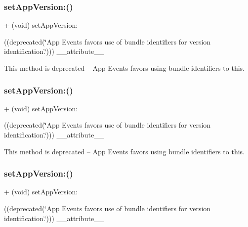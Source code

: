 \subsubsection{\texorpdfstring{set\+App\+Version\+:()}{setAppVersion:()}\hspace{0.1cm}{\footnotesize\ttfamily [1/5]}}
{\footnotesize\ttfamily + (void) set\+App\+Version\+: \begin{DoxyParamCaption}\item[{((deprecated(\char`\"{}App Events favors use of bundle identifiers for version identification.\char`\"{})))}]{\+\_\+\+\_\+attribute\+\_\+\+\_\+ }\end{DoxyParamCaption}}

This method is deprecated -- App Events favors using bundle identifiers to this. \mbox{\label{interfaceFBSettings_a01b8ded28d0bc4e050ff6eccb9a03383}} 
\subsubsection{\texorpdfstring{set\+App\+Version\+:()}{setAppVersion:()}\hspace{0.1cm}{\footnotesize\ttfamily [2/5]}}
{\footnotesize\ttfamily + (void) set\+App\+Version\+: \begin{DoxyParamCaption}\item[{((deprecated(\char`\"{}App Events favors use of bundle identifiers for version identification.\char`\"{})))}]{\+\_\+\+\_\+attribute\+\_\+\+\_\+ }\end{DoxyParamCaption}}

This method is deprecated -- App Events favors using bundle identifiers to this. \mbox{\label{interfaceFBSettings_a01b8ded28d0bc4e050ff6eccb9a03383}} 
\subsubsection{\texorpdfstring{set\+App\+Version\+:()}{setAppVersion:()}\hspace{0.1cm}{\footnotesize\ttfamily [3/5]}}
{\footnotesize\ttfamily + (void) set\+App\+Version\+: \begin{DoxyParamCaption}\item[{((deprecated(\char`\"{}App Events favors use of bundle identifiers for version identification.\char`\"{})))}]{\+\_\+\+\_\+attribute\+\_\+\+\_\+ }\end{DoxyParamCaption}}

